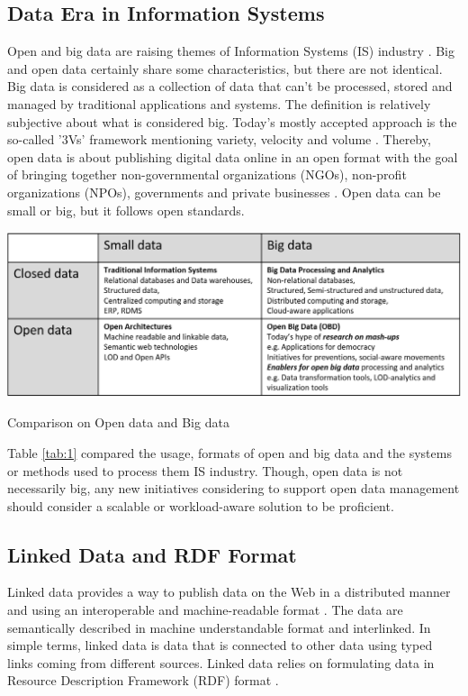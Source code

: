 \subsection{Data Era in Information Systems}
\noindent Open and big data are raising themes of Information Systems (IS) industry \cite{reframingopenbigdata}. Big and open data certainly share some characteristics, but there are not identical. Big data is considered as a collection of data that can't be processed, stored and managed by traditional applications and systems. The definition is  relatively subjective about what is considered big. Today's mostly accepted approach is the so-called '3Vs' framework mentioning variety, velocity and volume \cite{bigdataunderstanding}.  Thereby, open data is about publishing digital data online in an open format with the goal of bringing together non-governmental organizations (NGOs), non-profit organizations (NPOs), governments and private businesses \cite{reframingopenbigdata}. Open data can be small or big, but it follows open standards. 
\begin{center}
	\includegraphics[width=38em]{./Figures/openbigdata}
	\begin{table}[htbp]
    \caption{Comparison on Open data and Big data \cite{reframingopenbigdata}}
    \label{tab:1}
	\end{table}
\end{center}
\noindent Table \ref{tab:1} compared the usage, formats  of open and big data and the systems or methods used to process them IS industry. Though, open data is not necessarily big, any new initiatives considering to support open data management should consider a scalable or workload-aware solution to be proficient. 

\subsection{Linked Data and RDF Format}
\noindent Linked data provides a way to publish data on the Web in a distributed manner and using an interoperable and machine-readable format \cite{linkeddatasofar}. The data are semantically described in machine understandable format and interlinked. In simple terms, linked data is data that is connected to other data using typed links coming from different sources.  Linked data relies on formulating data in Resource Description Framework (RDF) format \cite{rdfdefinition}. 
 
